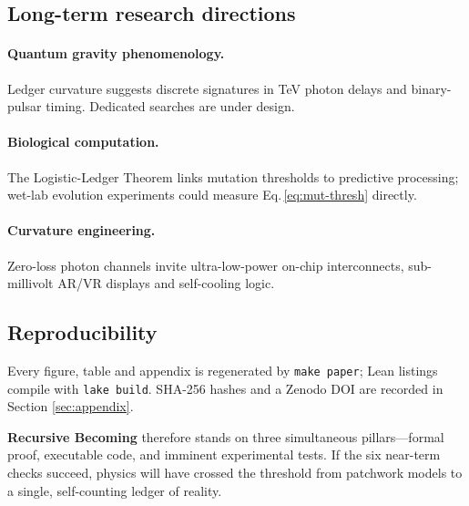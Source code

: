 \subsection{Long-term research directions}

\paragraph{Quantum gravity phenomenology.}
Ledger curvature suggests discrete signatures in TeV photon delays and
binary-pulsar timing.  Dedicated searches are under design.

\paragraph{Biological computation.}
The Logistic-Ledger Theorem links mutation thresholds to predictive
processing; wet-lab evolution experiments could measure
Eq.\,\eqref{eq:mut-thresh} directly.

\paragraph{Curvature engineering.}
Zero-loss photon channels invite ultra-low-power on-chip interconnects,
sub-millivolt AR/VR displays and self-cooling logic.

\subsection{Reproducibility}

Every figure, table and appendix is regenerated by \texttt{make paper};
Lean listings compile with \texttt{lake build}.  SHA-256 hashes and a
Zenodo DOI are recorded in Section \ref{sec:appendix}.

\bigskip\noindent
\textbf{Recursive Becoming} therefore stands on three simultaneous
pillars—formal proof, executable code, and imminent experimental tests.
If the six near-term checks succeed, physics will have crossed the
threshold from patchwork models to a single, self-counting ledger of
reality.

\FloatBarrier
\clearpage
